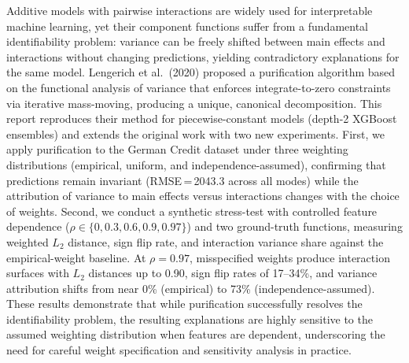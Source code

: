 Additive models with pairwise interactions are widely used for interpretable machine learning, yet their component functions suffer from a fundamental identifiability problem: variance can be freely shifted between main effects and interactions without changing predictions, yielding contradictory explanations for the same model.
Lengerich et al.\ (2020) proposed a purification algorithm based on the functional analysis of variance that enforces integrate-to-zero constraints via iterative mass-moving, producing a unique, canonical decomposition.
This report reproduces their method for piecewise-constant models (depth-2 XGBoost ensembles) and extends the original work with two new experiments.
First, we apply purification to the German Credit dataset under three weighting distributions (empirical, uniform, and independence-assumed), confirming that predictions remain invariant (RMSE\,=\,2043.3 across all modes) while the attribution of variance to main effects versus interactions changes with the choice of weights.
Second, we conduct a synthetic stress-test with controlled feature dependence ($\rho \in \{0, 0.3, 0.6, 0.9, 0.97\}$) and two ground-truth functions, measuring weighted $L_2$ distance, sign flip rate, and interaction variance share against the empirical-weight baseline.
At $\rho = 0.97$, misspecified weights produce interaction surfaces with $L_2$ distances up to 0.90, sign flip rates of 17--34\%, and variance attribution shifts from near 0\% (empirical) to 73\% (independence-assumed).
These results demonstrate that while purification successfully resolves the identifiability problem, the resulting explanations are highly sensitive to the assumed weighting distribution when features are dependent, underscoring the need for careful weight specification and sensitivity analysis in practice.
